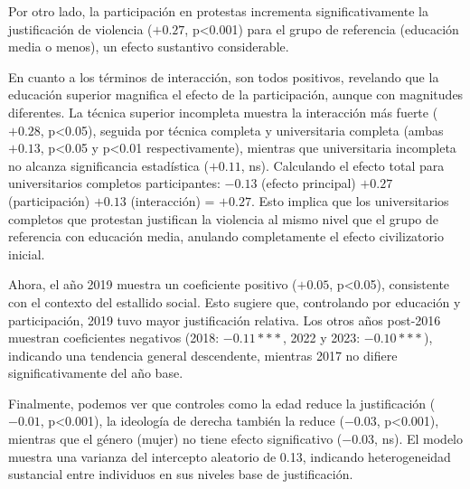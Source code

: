 \documentclass[
  13pt,
]{article}
\begin{document}
Por otro lado, la participación en protestas incrementa
significativamente la justificación de violencia (\(+0.27\),
p\textless0.001) para el grupo de referencia (educación media o menos),
un efecto sustantivo considerable.

En cuanto a los términos de interacción, son todos positivos, revelando
que la educación superior magnifica el efecto de la participación,
aunque con magnitudes diferentes. La técnica superior incompleta muestra
la interacción más fuerte (\(+0.28\), p\textless0.05), seguida por
técnica completa y universitaria completa (ambas \(+0.13\),
p\textless0.05 y p\textless0.01 respectivamente), mientras que
universitaria incompleta no alcanza significancia estadística
(\(+0.11\), ns). Calculando el efecto total para universitarios
completos participantes: \(-0.13\) (efecto principal) \(+0.27\)
(participación) \(+0.13\) (interacción) = \(+0.27\). Esto implica que
los universitarios completos que protestan justifican la violencia al
mismo nivel que el grupo de referencia con educación media, anulando
completamente el efecto civilizatorio inicial.

Ahora, el año 2019 muestra un coeficiente positivo (\(+0.05\),
p\textless0.05), consistente con el contexto del estallido social. Esto
sugiere que, controlando por educación y participación, 2019 tuvo mayor
justificación relativa. Los otros años post-2016 muestran coeficientes
negativos (2018: \(-0.11***\), 2022 y 2023: \(-0.10***\)), indicando una
tendencia general descendente, mientras 2017 no difiere
significativamente del año base.

Finalmente, podemos ver que controles como la edad reduce la
justificación (\(-0.01\), p\textless0.001), la ideología de derecha
también la reduce (\(-0.03\), p\textless0.001), mientras que el género
(mujer) no tiene efecto significativo (\(-0.03\), ns). El modelo muestra
una varianza del intercepto aleatorio de 0.13, indicando heterogeneidad
sustancial entre individuos en sus niveles base de justificación.
\end{document}
